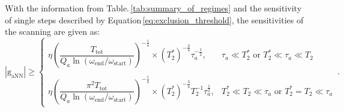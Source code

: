 \documentclass{WileyMSP-template}
\newcommand{\YZ}[1]{\textcolor{purple}{Yuzhe: #1}}
\begin{document}

With the information from Table.\,\ref{tab:summary_of_regimes} and the sensitivity of single steps described by Equation\,\eqref{eq:exclusion_threshold}, the sensitivities of the scanning are given as:
\begin{equation}
|\mathrm{g_{aNN}}| \geqslant \left\{
\begin{array}{ll}
	\eta
	\left(\dfrac{T_{\mathrm{tot}}}{Q_a\ln{ \left(\omega_{\mathrm{end}}/\omega_{\mathrm{start}} \right) } }\right)^{-\frac{1}{4}}   
	\times  (T_2^*)^{-\frac{3}{4}} \tau_a^{-\frac{1}{2}},
	& \tau_a\ll T_2^* \text{ or }  T_2^*\ll\tau_a\ll T_2 \\
	& \\
	\eta
	\left(\dfrac{\pi^2 T_{\mathrm{tot}}}{Q_a\ln{ \left(\omega_{\mathrm{end}}/\omega_{\mathrm{start}} \right) } }\right)^{-\frac{1}{4}}  
	\times  (T_2^*)^{-\frac{3}{4}} T_2^{-1} \tau_a^{\frac{1}{2}},
	& T_2^* \ll T_2 \ll \tau_a \text{ or } T_2^*=T_2 \ll \tau_a  %
\end{array} \right.
\,.\label{eq:gaNN_Ttot_optimal}
\end{equation}
\end{document}
